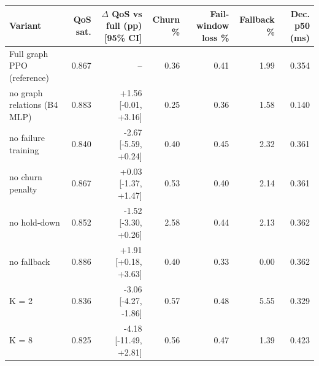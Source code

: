 \begin{tabular}{lrrrrrr}
\toprule
Variant & QoS sat. & $\Delta$ QoS vs full (pp) [95\% CI] & Churn \% & Fail-window loss \% & Fallback \% & Dec. p50 (ms) \\
\midrule
Full graph PPO (reference) & 0.867 & -- & 0.36 & 0.41 & 1.99 & 0.354 \\
no graph relations (B4 MLP) & 0.883 & +1.56 [-0.01, +3.16] & 0.25 & 0.36 & 1.58 & 0.140 \\
no failure training & 0.840 & -2.67 [-5.59, +0.24] & 0.40 & 0.45 & 2.32 & 0.361 \\
no churn penalty & 0.867 & +0.03 [-1.37, +1.47] & 0.53 & 0.40 & 2.14 & 0.361 \\
no hold-down & 0.852 & -1.52 [-3.30, +0.26] & 2.58 & 0.44 & 2.13 & 0.362 \\
no fallback & 0.886 & +1.91 [+0.18, +3.63] & 0.40 & 0.33 & 0.00 & 0.362 \\
K = 2 & 0.836 & -3.06 [-4.27, -1.86] & 0.57 & 0.48 & 5.55 & 0.329 \\
K = 8 & 0.825 & -4.18 [-11.49, +2.81] & 0.56 & 0.47 & 1.39 & 0.423 \\
\bottomrule
\end{tabular}